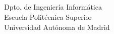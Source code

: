 \chapter*{}

\vspace*{0.2cm}

\begin{center}

\Huge \MakeUppercase{\textbf{\titulo}}

\vspace{7cm}

\Large \autor \\
\Large \tutor \\

\vspace{6cm}


Dpto. de Ingeniería Informática \\
Escuela Politécnica Superior \\
Universidad Autónoma de Madrid \\
\fecha

\end{center}

\normalsize

\newpage \thispagestyle{empty} %
